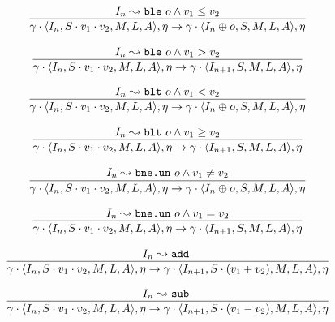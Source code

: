 \documentclass[declaration,shortabstract,english,mgr]{iithesis}
\newcommand{\mstate}[5] {
	\langle#1, #2, #3, #4, #5\rangle
}
\newcommand{\ipointsto}[3] {
	#1 \leadsto \texttt{#2} \text{ } #3
}
\begin{document}
\begin{equation}
\label{eq:semantics_ble1}
	\infer{
		\gamma \cdot \mstate{I_n}{S \cdot v_1 \cdot v_2}{M}{L}{A}, \eta
			\rightarrow
		\gamma \cdot \mstate{I_{n} \oplus o}{S}{M}{L}{A}, \eta
	}
	{\ipointsto{I_n}{ble}{o} \land v_1 \leq v_2}
\end{equation}

\begin{equation}
\label{eq:semantics_ble2}
	\infer{
		\gamma \cdot \mstate{I_n}{S \cdot v_1 \cdot v_2}{M}{L}{A}, \eta
			\rightarrow
		\gamma \cdot \mstate{I_{n+1}}{S}{M}{L}{A}, \eta
	}
	{\ipointsto{I_n}{ble}{o} \land v_1 > v_2}
\end{equation}

\begin{equation}
\label{eq:semantics_blt1}
	\infer{
		\gamma \cdot \mstate{I_n}{S \cdot v_1 \cdot v_2}{M}{L}{A}, \eta
			\rightarrow
		\gamma \cdot \mstate{I_{n} \oplus o}{S}{M}{L}{A}, \eta
	}
	{\ipointsto{I_n}{blt}{o} \land v_1 < v_2}
\end{equation}

\begin{equation}
\label{eq:semantics_blt2}
	\infer{
		\gamma \cdot \mstate{I_n}{S \cdot v_1 \cdot v_2}{M}{L}{A}, \eta
			\rightarrow
		\gamma \cdot \mstate{I_{n+1}}{S}{M}{L}{A}, \eta
	}
	{\ipointsto{I_n}{blt}{o} \land v_1 \geq v_2}
\end{equation}

\begin{equation}
\label{eq:semantics_bneun1}
	\infer{
		\gamma \cdot \mstate{I_n}{S \cdot v_1 \cdot v_2}{M}{L}{A}, \eta
			\rightarrow
		\gamma \cdot \mstate{I_{n} \oplus o}{S}{M}{L}{A}, \eta
	}
	{\ipointsto{I_n}{bne.un}{o} \land v_1 \neq v_2}
\end{equation}

\begin{equation}
\label{eq:semantics_bneun2}
	\infer{
		\gamma \cdot \mstate{I_n}{S \cdot v_1 \cdot v_2}{M}{L}{A}, \eta
			\rightarrow
		\gamma \cdot \mstate{I_{n+1}}{S}{M}{L}{A}, \eta
	}
	{\ipointsto{I_n}{bne.un}{o} \land v_1 = v_2}
\end{equation}

\begin{equation}
\label{eq:semantics_add}
	\infer{
		\gamma \cdot \mstate{I_n}{S \cdot v_1 \cdot v_2}{M}{L}{A}, \eta
			\rightarrow
		\gamma \cdot \mstate{I_{n+1}}{S \cdot (v_1 + v_2)}{M}{L}{A}, \eta		
	}
	{\ipointsto{I_n}{add}}
\end{equation}

\begin{equation}
\label{eq:semantics_sub}
	\infer{
		\gamma \cdot \mstate{I_n}{S \cdot v_1 \cdot v_2}{M}{L}{A}, \eta
			\rightarrow
		\gamma \cdot \mstate{I_{n+1}}{S \cdot (v_1 - v_2)}{M}{L}{A}, \eta		
	}
	{\ipointsto{I_n}{sub}}
\end{equation}
\end{document}
